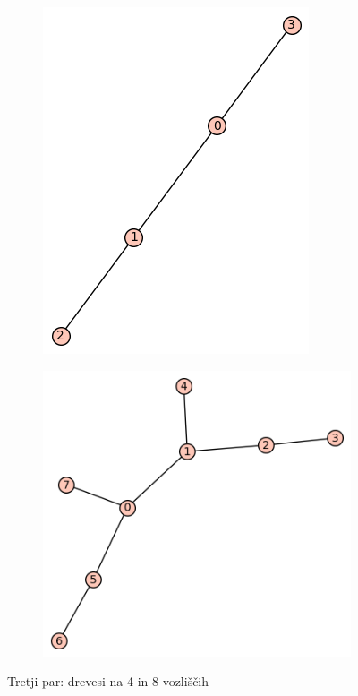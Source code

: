 \documentclass[12pt, a4paper]{article}
\begin{document}
\begin{center}
\begin{figure}[!htb]
\centering
\begin{subfigure}{0.5\textwidth}
  \centering
  \includegraphics[width=0.35\linewidth]{t-3}
\end{subfigure}%
\begin{subfigure}{0.5\textwidth}
  \centering
  \includegraphics[width=0.5\linewidth]{t-30}
\end{subfigure}
\caption{Tretji par: drevesi na 4 in 8 vozliščih}
\label{fig:test}
\end{figure}
\end{center}
\end{document}
